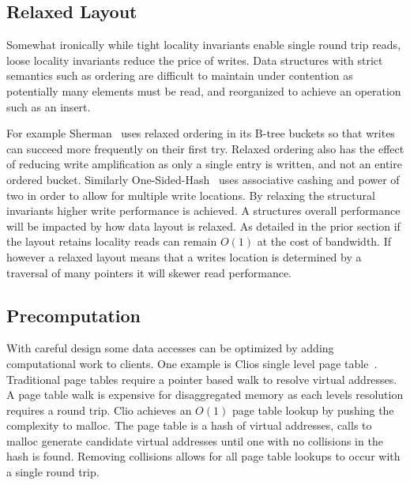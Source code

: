 \subsection{Relaxed Layout} 

Somewhat ironically while tight locality invariants enable single round trip
reads, loose locality invariants reduce the price of writes. Data structures
with strict semantics such as ordering are difficult to maintain under
contention as potentially many elements must be read, and reorganized to achieve
an operation such as an insert.

For example Sherman~\cite{sherman} uses relaxed ordering in its B-tree buckets
so that writes can succeed more frequently on their first try. Relaxed ordering
also has the effect of reducing write amplification as only a single entry is
written, and not an entire ordered bucket. Similarly
One-Sided-Hash~\cite{one-sided-hash} uses associative cashing and power of two
in order to allow for multiple write locations. By relaxing the structural
invariants higher write performance is achieved. A structures overall
performance will be impacted by how data layout is relaxed. As detailed in the
prior section if the layout retains locality reads can remain $O(1)$ at the cost
of bandwidth. If however a relaxed layout means that a writes location is
determined by a traversal of many pointers it will skewer read performance.


\subsection{Precomputation} 

With careful design some data accesses can be optimized by adding computational
work to clients. One example is Clios single level page table~\cite{clio}.
Traditional page tables require a pointer based walk to resolve virtual
addresses. A page table walk is expensive for disaggregated memory as each
levels resolution requires a round trip. Clio achieves an $O(1)$ page table
lookup by pushing the complexity to malloc. The page table is a hash of virtual
addresses, calls to malloc generate candidate virtual addresses until one with
no collisions in the hash is found. Removing collisions allows for all page
table lookups to occur with a single round trip.

